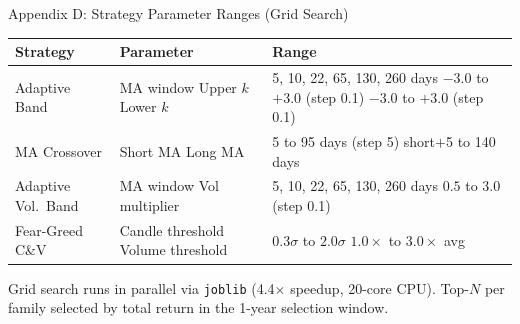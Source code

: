 \documentclass[aspectratio=169]{beamer}
\begin{document}
\begin{frame}{Appendix D: Strategy Parameter Ranges (Grid Search)}
  \small
  \begin{tabular}{p{3.5cm}p{3.0cm}p{6.0cm}}
    \toprule
    Strategy & Parameter & Range \\
    \midrule
    Adaptive Band
      & MA window \newline Upper $k$ \newline Lower $k$
      & 5, 10, 22, 65, 130, 260 days \newline $-3.0$ to $+3.0$ (step 0.1) \newline $-3.0$ to $+3.0$ (step 0.1) \\
    \midrule
    MA Crossover
      & Short MA \newline Long MA
      & 5 to 95 days (step 5) \newline short$+$5 to 140 days \\
    \midrule
    Adaptive Vol.\ Band
      & MA window \newline Vol multiplier
      & 5, 10, 22, 65, 130, 260 days \newline $0.5$ to $3.0$ (step 0.1) \\
    \midrule
    Fear-Greed C\&V
      & Candle threshold \newline Volume threshold
      & $0.3\sigma$ to $2.0\sigma$ \newline $1.0\times$ to $3.0\times$ avg \\
    \bottomrule
  \end{tabular}

  \vspace{0.4em}
  Grid search runs in parallel via \texttt{joblib} (4.4$\times$ speedup, 20-core CPU).
  Top-$N$ per family selected by total return in the 1-year selection window.
\end{frame}
\end{document}
